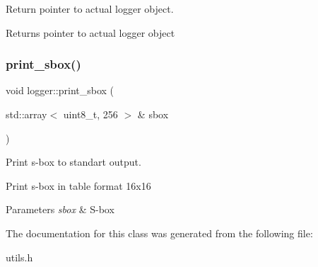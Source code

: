 Return pointer to actual logger object. 

\begin{DoxyReturn}{Returns}
pointer to actual logger object 
\end{DoxyReturn}
\mbox{\label{classlogger_a6d4c069f536c8c1ba5b414eb23cd60a5}} 
\subsubsection{\texorpdfstring{print\+\_\+sbox()}{print\_sbox()}}
{\footnotesize\ttfamily void logger\+::print\+\_\+sbox (\begin{DoxyParamCaption}\item[{std\+::array$<$ uint8\+\_\+t, 256 $>$ \&}]{sbox }\end{DoxyParamCaption})\hspace{0.3cm}{\ttfamily [inline]}}



Print s-\/box to standart output. 

Print s-\/box in table format 16x16


\begin{DoxyParams}{Parameters}
{\em sbox} & S-\/box \\
\hline
\end{DoxyParams}


The documentation for this class was generated from the following file\+:\begin{DoxyCompactItemize}
\item 
utils.\+h\end{DoxyCompactItemize}
